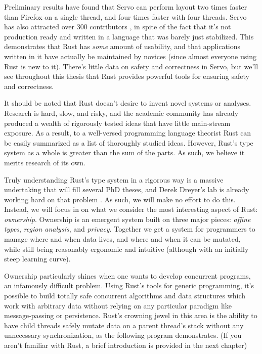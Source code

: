 Preliminary results \cite{servo-exp} have found that Servo can
perform layout two times faster than Firefox on a single thread, and four times
faster with four threads. Servo has also attracted over 300 contributors
\cite{servo-gh}, in spite of the fact that it's not production ready and
written in a language that was barely just stabilized. This demonstrates that
Rust has \emph{some} amount of usability, and that applications written in it
have actually be maintained by novices (since almost everyone using Rust
is new to it). There's little data on safety and correctness in Servo, but we'll
see throughout this thesis that Rust provides powerful tools for ensuring
safety and correctness.

It should be noted that Rust doesn't desire to invent novel systems or analyses.
Research is hard, slow, and risky, and the academic community has already produced
a wealth of rigorously tested ideas that have little main-stream exposure. As a
result, to a well-versed programming language theorist Rust can be easily
summarized as a list of thoroughly studied ideas. However, Rust's type system
as a whole is greater than the sum of the parts. As such, we believe it merits
research of its own.

Truly understanding Rust's type system in a rigorous way is a massive
undertaking that will fill several PhD theses, and Derek Dreyer's lab is already
working hard on that problem \cite{rustbelt}. As such, we will make no effort
to do this. Instead, we will focus in on what we consider the most interesting
aspect of Rust: \emph{ownership}. Ownership is an emergent system built on three
major pieces: \emph{affine types}, \emph{region analysis}, and \emph{privacy}. Together we get
a system for programmers to manage where and when data lives, and where
and when it can be mutated, while still being reasonably ergonomic and intuitive
(although with an initially steep learning curve).

Ownership particularly shines when one wants to develop concurrent programs,
an infamously difficult problem. Using Rust's tools for generic programming,
it's possible to build totally safe concurrent algorithms and data structures
which work with arbitrary data without relying on any particular paradigm like
message-passing or persistence. Rust's crowning jewel in this area is the
ability to have child threads safely mutate data on a parent thread's stack
without any unnecessary synchronization, as the following program demonstrates.
(If you aren't familiar with Rust, a brief introduction is provided in the
next chapter)

